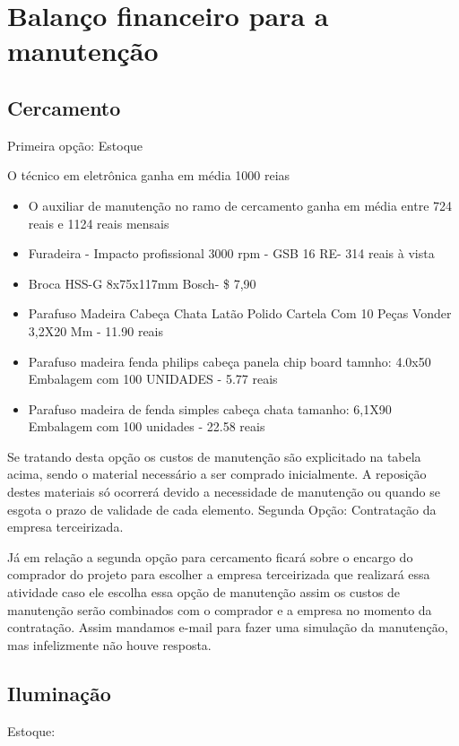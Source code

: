 \section{Balanço financeiro para a manutenção}

\subsection{Cercamento}

Primeira opção: Estoque

O técnico em eletrônica ganha em média 1000 reias

\begin{itemize}
          \item O auxiliar de manutenção no ramo de cercamento ganha em média entre 724 reais e 1124 reais mensais \cite{catho}
          \item Furadeira - Impacto profissional 3000 rpm - GSB 16 RE- 314 reais à vista
          \item Broca HSS-G 8x75x117mm Bosch- \$ 7,90 \cite{agrotama}
          \item Parafuso Madeira Cabeça Chata Latão Polido Cartela Com 10 Peças Vonder 3,2X20 Mm - 11.90 reais \cite{fixpar}
          \item Parafuso madeira fenda philips cabeça panela chip board tamnho: 4.0x50 Embalagem com 100 UNIDADES - 5.77 reais \cite{fixpar}
          \item Parafuso madeira de fenda simples cabeça chata tamanho: 6,1X90 Embalagem com 100 unidades - 22.58 reais \cite{fixpar}
\end{itemize}

Se tratando desta opção os custos de manutenção são explicitado na tabela acima, sendo o material necessário a ser comprado inicialmente. A reposição destes materiais só ocorrerá devido a necessidade de manutenção ou quando se esgota o prazo de validade de cada elemento.
Segunda Opção: Contratação da empresa terceirizada.

Já em relação a segunda opção para cercamento ficará sobre o encargo do comprador do projeto para escolher a empresa terceirizada que realizará essa atividade caso ele escolha essa opção de manutenção assim os custos de manutenção serão combinados com o comprador e a empresa no momento da contratação. Assim mandamos e-mail para fazer uma simulação da manutenção, mas infelizmente não houve resposta.
\subsection{Iluminação}
Estoque:

